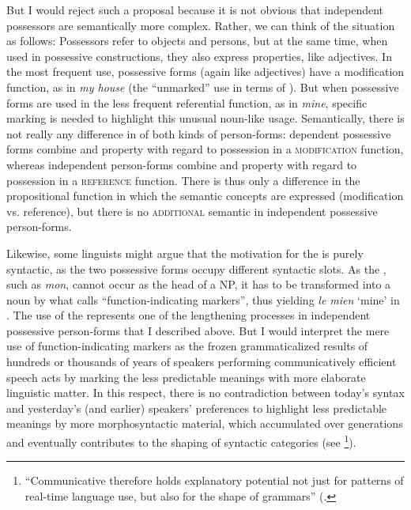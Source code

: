 \documentclass[output=paper]{langsci/langscibook}
\begin{document}
But I would reject such a proposal because it is not obvious that independent possessors are semantically more complex. Rather, we can think of the situation as follows: Possessors refer to objects and persons, but at the same time, when used in possessive constructions, they also express properties, like adjectives. In the most frequent use, possessive forms (again like adjectives) have a modification function, as in \textit{my house} (the “unmarked” use in terms of \citealt{Croft1991}). But when possessive forms are used in the less frequent referential function, as in \textit{mine}, specific marking is needed to highlight this unusual noun-like usage. Semantically, there is not really any difference in  of both kinds of person-forms: dependent possessive forms combine  and property with regard to possession in a \textsc{modification} function, whereas independent person-forms combine  and property with regard to possession in a \textsc{reference} function. There is thus only a difference in the propositional function in which the semantic concepts are expressed (modification vs. reference), but there is no \textsc{additional} semantic  in independent possessive person-forms. 

Likewise, some linguists might argue that the motivation for the  is purely syntactic, as the two possessive forms occupy different syntactic slots. As the , such as  \textit{mon}, cannot occur as the head of a NP, it has to be transformed into a noun by what \citet[58f.]{Croft1991_Cat} calls “function-indicating markers”, thus yielding \textit{le mien} ‘mine’ in . The use of the   represents one of the lengthening processes in independent possessive person-forms that I described above. But I would interpret the mere use of function-indicating markers as the frozen grammaticalized results of hundreds or thousands of years of speakers performing communicatively efficient speech acts by marking the less predictable meanings with more elaborate linguistic matter. In this respect, there is no contradiction between today’s syntax and yesterday’s (and earlier) speakers' preferences to highlight less predictable meanings by more morphosyntactic material, which accumulated over generations and eventually contributes to the shaping of syntactic categories (see \citealt[171]{NorcliffeJaeger2016}\footnote{“Communicative  therefore holds explanatory potential not just for patterns of real-time language use, but also for the shape of grammars” (\citealt[171]{NorcliffeJaeger2016}.}). 
\end{document}
